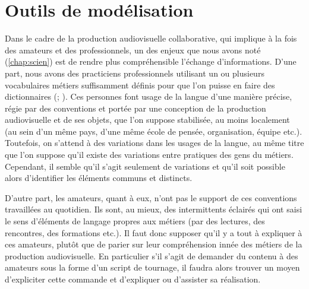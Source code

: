 \chapter{Outils de modélisation}\label{c:omod}




Dans le cadre de la production audiovisuelle collaborative, qui implique à la fois des amateurs et des professionnels, un des enjeux que nous avons noté (\ref{chap:scien}) est de rendre plus compréhensible l'échange d'informations. 
D'une part, nous avons des practiciens professionnels utilisant un ou plusieurs vocabulaires métiers suffisamment définis pour que l'on puisse en faire des dictionnaires (\cite{Journot2008}; \cite{Pinel2008}). 
Ces personnes font usage de la langue d'une manière précise, régie par des conventions et portée par une conception de la production audiovisuelle et de ses objets, que l'on suppose stabilisée, au moins localement (au sein d'un même pays, d'une même école de pensée, organisation, équipe etc.).
Toutefois, on s'attend à des variations dans les usages de la langue, au même titre que l'on suppose qu'il existe des variations entre pratiques des gens du métiers.
Cependant, il semble qu'il s'agit seulement de variations et qu'il soit possible alors d'identifier les éléments communs et distincts.

D'autre part, les amateurs, quant à eux, n'ont pas le support de ces conventions travaillées au quotidien.
Ils sont, au mieux, des intermittents éclairés qui ont saisi le sens d'éléments de langage propres aux métiers (par des lectures, des rencontres, des formations etc.). 
Il faut donc supposer qu'il y a tout à expliquer à ces amateurs, plutôt que de parier sur leur compréhension innée des métiers de la production audiovisuelle.
En particulier s'il s'agit de demander du contenu à des amateurs sous la forme d'un script de tournage, il faudra alors trouver un moyen d'expliciter cette commande et d'expliquer ou d'assister sa réalisation. 

